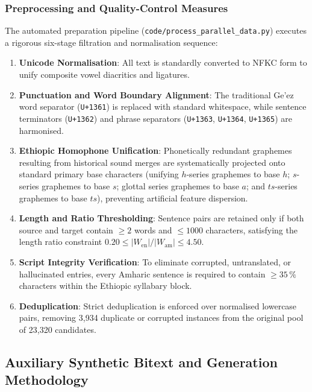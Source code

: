 \documentclass[11pt,a4paper]{article}
\begin{document}
\subsubsection{Preprocessing and Quality-Control Measures}
The automated preparation pipeline (\texttt{code/process\_parallel\_data.py})
executes a rigorous six-stage filtration and normalisation sequence:
\begin{enumerate}
  \item \textbf{Unicode Normalisation}: All text is standardly converted
        to NFKC form to unify composite vowel diacritics and ligatures.
  \item \textbf{Punctuation and Word Boundary Alignment}: The traditional
        Ge'ez word separator (\texttt{U+1361})
        is replaced with standard whitespace, while sentence terminators
        (\texttt{U+1362}) and phrase separators
        (\texttt{U+1363}, \texttt{U+1364}, \texttt{U+1365}) are harmonised.
  \item \textbf{Ethiopic Homophone Unification}: Phonetically redundant
        graphemes resulting from historical sound merges are systematically
        projected onto standard primary base characters (unifying
        $h$-series graphemes to base $h$; $s$-series graphemes to base $s$;
        glottal series graphemes to base $a$; and $ts$-series graphemes
        to base $ts$), preventing artificial feature dispersion.
  \item \textbf{Length and Ratio Thresholding}: Sentence pairs are retained
        only if both source and target contain $\ge 2$ words and $\le 1000$
        characters, satisfying the length ratio constraint
        $0.20 \le |W_{\text{en}}| / |W_{\text{am}}| \le 4.50$.
  \item \textbf{Script Integrity Verification}: To eliminate corrupted,
        untranslated, or hallucinated entries, every Amharic sentence is
        required to contain $\ge 35\,\%$ characters within the Ethiopic
        syllabary block.
  \item \textbf{Deduplication}: Strict deduplication is enforced over
        normalised lowercase pairs, removing 3,934 duplicate or corrupted
        instances from the original pool of 23,320 candidates.
\end{enumerate}

\subsection{Auxiliary Synthetic Bitext and Generation Methodology}
\label{sec:synthetic_dataset}
\end{document}
